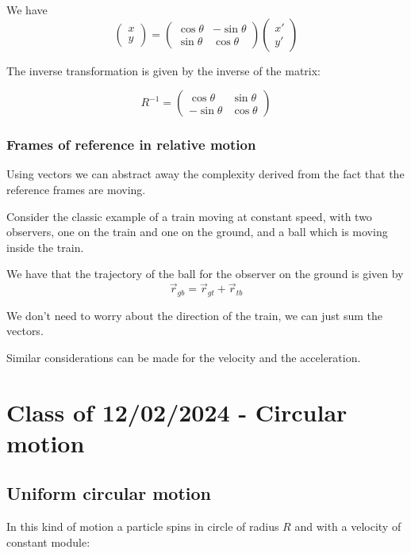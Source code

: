 \documentclass[10pt]{extarticle}
\begin{document}
We have
$$
    \begin{pmatrix}
        x \\
        y
    \end{pmatrix}
    =
    \begin{pmatrix}
        \cos \theta & -\sin \theta \\
        \sin \theta & \cos \theta
    \end{pmatrix}
    \begin{pmatrix}
        x' \\
        y'
    \end{pmatrix}
$$

The inverse transformation is given by the inverse of the matrix:

$$
    R^{-1} = \begin{pmatrix}
        \cos \theta  & \sin \theta \\
        -\sin \theta & \cos \theta
    \end{pmatrix}
$$

\subsubsection{Frames of reference in relative motion}

Using vectors we can abstract away the complexity derived from the fact that the reference frames are moving.

Consider the classic example of a train moving at constant speed, with two observers, one on the train and one on the ground,
and a ball which is moving inside the train.

We have that the trajectory of the ball for the observer on the ground is given by
$$
    \vec{r}_{gb} = \vec{r}_{gt} + \vec{r}_{tb}
$$

We don't need to worry about the direction of the train, we can just sum the vectors.

Similar considerations can be made for the velocity and the acceleration.

\section{Class of 12/02/2024 - Circular motion}

\subsection {Uniform circular motion}

In this kind of motion a particle spins in circle of radius $R$
and with a velocity of constant module:
\end{document}
